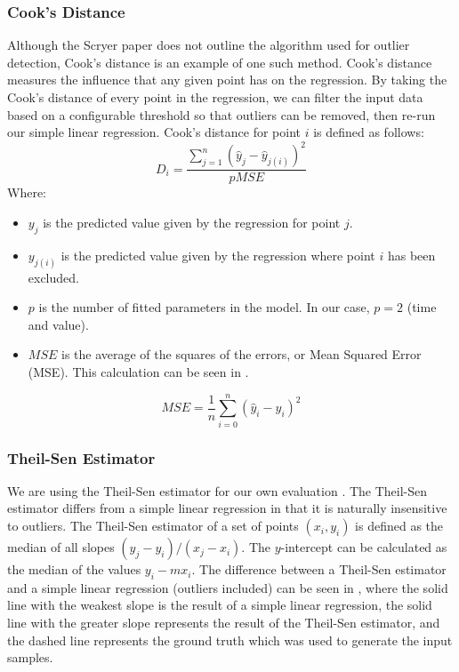 \subsubsection{Cook's Distance}
\label{sec:cook}
Although the Scryer paper does not outline the algorithm used for outlier detection, Cook's distance is an example of one such method. Cook's distance \cite{statistics} measures the influence that any given point has on the regression. By taking the Cook's distance of every point in the regression, we can filter the input data based on a configurable threshold so that outliers can be removed, then re-run our simple linear regression. Cook's distance for point $i$ is defined as follows:
%
\begin{equation}
\label{eq:cook}
D_i = \frac{\sum_{j=1}^{n}(\hat{y}_j - \hat{y}_{j(i)})^2}{p MSE}
\end{equation}
%
Where:
\begin{itemize}
\item $y_j$ is the predicted value given by the regression for point $j$.
\item $y_{j(i)}$ is the predicted value given by the regression where point $i$ has been excluded.
\item $p$ is the number of fitted parameters in the model. In our case, $p = 2$ (time and value).
\item $MSE$ is the average of the squares of the errors, or Mean Squared Error (MSE). This calculation can be seen in .
\end{itemize}
%
\begin{equation}
\label{eq:mse}
MSE = \frac{1}{n} \sum_{i=0}^{n} (\hat{y}_i - y_i)^2
\end{equation}

\subsubsection{Theil-Sen Estimator}
\label{sec:tse}
We are using the Theil-Sen estimator for our own evaluation \cite{statistics}. The Theil-Sen estimator differs from a simple linear regression in that it is naturally insensitive to outliers. The Theil-Sen estimator of a set of points $(x_i,y_i)$ is defined as the median of all slopes $(y_j - y_i)/(x_j - x_i)$. The $y$-intercept can be calculated as the median of the values $y_i - mx_i$. The difference between a Theil-Sen estimator and a simple linear regression (outliers included) can be seen in , where the solid line with the weakest slope is the result of a simple linear regression, the solid line with the greater slope represents the result of the Theil-Sen estimator, and the dashed line represents the ground truth which was used to generate the input samples.

